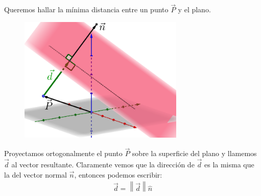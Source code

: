 \documentclass[12pt, fleqn]{report}                             %
\theoremstyle{break}                                            %
\newcommand{\Abs}[1]{\left\lVert #1 \right\lVert}               %
\begin{document}
            Queremos hallar la mínima distancia entre un punto $\vec{P}$ y el plano.
            
            \begin{figure}[H]
                \centering
                \includegraphics[width=0.7\textwidth]{distancePointPlane}
            \end{figure}
            
            Proyectamos ortogonalmente el punto $\vec{P}$ sobre la superficie del plano y llamemos $\vec{d}$ al vector resultante.
            Claramente vemos que la dirección de $\vec{d}$ es la misma que la del vector normal $\vec{n}$, entonces podemos escribir:
            \begin{align}
                \vec{d} = \Abs{\vec{d}} \hat{n}
            \end{align}
            
            \clearpage
\end{document}

